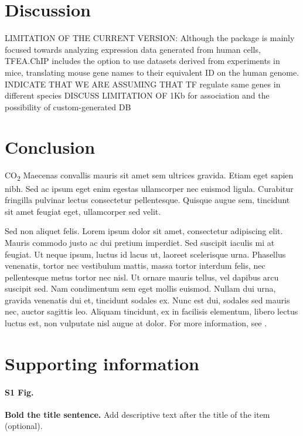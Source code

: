 \documentclass[10pt,letterpaper]{article}
\begin{document}
	\section*{Discussion}
	LIMITATION OF THE CURRENT VERSION: Although the package is mainly focused towards analyzing expression data generated from human cells, TFEA.ChIP includes the option to use datasets derived from experiments in mice, translating mouse gene names to their equivalent ID on the human genome. INDICATE THAT WE ARE ASSUMING THAT TF regulate same genes in different species
	DISCUSS LIMITATION OF 1Kb for association and the possibility of custom-generated DB
	
	\section*{Conclusion}
	
	CO\textsubscript{2} Maecenas convallis mauris sit amet sem ultrices gravida. Etiam eget sapien nibh. Sed ac ipsum eget enim egestas ullamcorper nec euismod ligula. Curabitur fringilla pulvinar lectus consectetur pellentesque. Quisque augue sem, tincidunt sit amet feugiat eget, ullamcorper sed velit. 
	
	Sed non aliquet felis. Lorem ipsum dolor sit amet, consectetur adipiscing elit. Mauris commodo justo ac dui pretium imperdiet. Sed suscipit iaculis mi at feugiat. Ut neque ipsum, luctus id lacus ut, laoreet scelerisque urna. Phasellus venenatis, tortor nec vestibulum mattis, massa tortor interdum felis, nec pellentesque metus tortor nec nisl. Ut ornare mauris tellus, vel dapibus arcu suscipit sed. Nam condimentum sem eget mollis euismod. Nullam dui urna, gravida venenatis dui et, tincidunt sodales ex. Nunc est dui, sodales sed mauris nec, auctor sagittis leo. Aliquam tincidunt, ex in facilisis elementum, libero lectus luctus est, non vulputate nisl augue at dolor. For more information, see .
	
	\section*{Supporting information}
	
	\paragraph*{S1 Fig.}
	\label{S1_Fig}
	{\bf Bold the title sentence.} Add descriptive text after the title of the item (optional).
	
\end{document}
